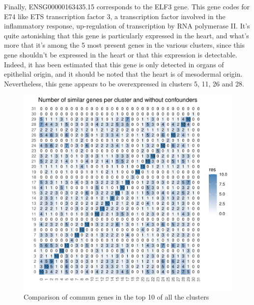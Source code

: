 \documentclass[a4paper, 11pt]{article}
\begin{document}
\begin{multicols}{2}
Finally, ENSG00000163435.15 corresponds to the ELF3 gene. This gene codes for E74 like ETS transcription factor 3, a transcription factor involved in the inflammatory response, up-regulation of transcription by RNA polymerase II. It's quite astonishing that this gene is particularly expressed in the heart, and what's more that it's among the 5 most present genes in the various clusters, since this gene shouldn't be expressed in the heart or that this expression is detectable. Indeed, it has been estimated that this gene is only detected in organs of epithelial origin, and it should be noted that the heart is of mesodermal origin. Nevertheless, this gene appears to be overexpressed in clusters 5, 11, 26 and 28.
\begin{figure}[H]
	\centering
	\includegraphics[width=\columnwidth]{figures/final_analysis/SimilGenes}
	\caption{Comparison of commun genes in the top 10 of all the clusters}
	\label{fig:similGenes}
\end{figure}
\begin{figure}[H]
	\centering

\end{figure}
\end{multicols}
\end{document}
